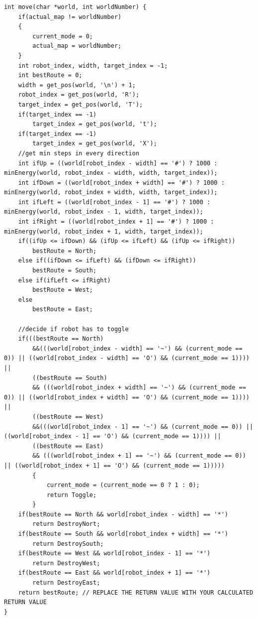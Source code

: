 \documentclass[10pt,journal,compsoc]{IEEEtran}
\begin{document}
\begin{lstlisting}[label = cpp]
int move(char *world, int worldNumber) {
    if(actual_map != worldNumber)
    {
        current_mode = 0;
        actual_map = worldNumber;
    }
    int robot_index, width, target_index = -1;
    int bestRoute = 0;
    width = get_pos(world, '\n') + 1;
    robot_index = get_pos(world, 'R');
    target_index = get_pos(world, 'T');
    if(target_index == -1)
        target_index = get_pos(world, 't');
    if(target_index == -1)
        target_index = get_pos(world, 'X');
    //get min steps in every direction
    int ifUp = ((world[robot_index - width] == '#') ? 1000 : minEnergy(world, robot_index - width, width, target_index));
    int ifDown = ((world[robot_index + width] == '#') ? 1000 : minEnergy(world, robot_index + width, width, target_index));
    int ifLeft = ((world[robot_index - 1] == '#') ? 1000 : minEnergy(world, robot_index - 1, width, target_index)); 
    int ifRight = ((world[robot_index + 1] == '#') ? 1000 : minEnergy(world, robot_index + 1, width, target_index));
    if((ifUp <= ifDown) && (ifUp <= ifLeft) && (ifUp <= ifRight))
        bestRoute = North;
    else if((ifDown <= ifLeft) && (ifDown <= ifRight))
        bestRoute = South;
    else if(ifLeft <= ifRight)
        bestRoute = West;
    else
        bestRoute = East;

    //decide if robot has to toggle
    if(((bestRoute == North)
        &&(((world[robot_index - width] == '~') && (current_mode == 0)) || ((world[robot_index - width] == 'O') && (current_mode == 1)))) ||
        ((bestRoute == South)
        && (((world[robot_index + width] == '~') && (current_mode == 0)) || ((world[robot_index + width] == 'O') && (current_mode == 1)))) ||
        ((bestRoute == West)
        &&(((world[robot_index - 1] == '~') && (current_mode == 0)) || ((world[robot_index - 1] == 'O') && (current_mode == 1)))) ||
        ((bestRoute == East)
        && (((world[robot_index + 1] == '~') && (current_mode == 0)) || ((world[robot_index + 1] == 'O') && (current_mode == 1)))))
        {
            current_mode = (current_mode == 0 ? 1 : 0);
            return Toggle;
        }
    if(bestRoute == North && world[robot_index - width] == '*')
        return DestroyNort;
    if(bestRoute == South && world[robot_index + width] == '*')
        return DestroySouth;
    if(bestRoute == West && world[robot_index - 1] == '*')
        return DestroyWest;
    if(bestRoute == East && world[robot_index + 1] == '*')
        return DestroyEast;
    return bestRoute; // REPLACE THE RETURN VALUE WITH YOUR CALCULATED RETURN VALUE
}


\end{lstlisting}
\end{document}
